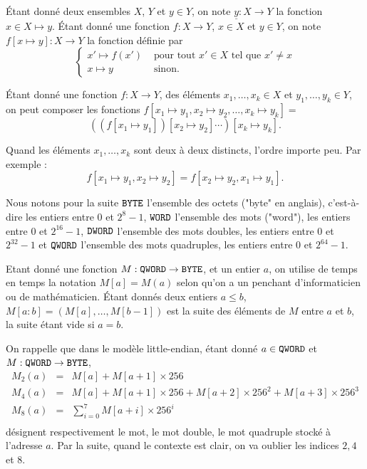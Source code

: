 \documentclass{book}
\newenvironment{formalisme}[1]{%
	\def\FrameCommand{\fboxrule=\FrameRule\fboxsep=\FrameSep \fcolorbox{red!10}{red!5}}%
	\MakeFramed {\advance\hsize-\width \FrameRestore}
	\noindent {\bf #1}\\
}%
{\endMakeFramed}
\newcommand{\BYTE}{{\tt BYTE}}
\newcommand{\WORD}{{\tt WORD}}
\newcommand{\DWORD}{{\tt DWORD}}
\newcommand{\QWORD}{{\tt QWORD}}
\begin{document}
\'Etant donné deux ensembles $X$, $Y$ et $y \in Y$, on note $\underline{y} : X \to Y$ la fonction $x \in X \mapsto y$. \'Etant donné une fonction $f : X \to Y$, $x \in X$ et $y \in Y$, on note $f[x \mapsto y] : X\to Y $ la fonction définie par
$$\left\{
\begin{array}{ll}
x' \mapsto f(x') & \text{ pour tout } x' \in X \text{ tel que }x' \neq x\\
x \mapsto y & \text{ sinon}.
\end{array}\right.$$

\'Etant donné une fonction $f : X \to Y$, des éléments $x_1, \ldots, x_k \in X$ et $y_1,\ldots, y_k \in Y$, 
on peut composer les fonctions $f[x_1 \mapsto y_1, x_2 \mapsto y_2, \ldots, x_k \mapsto y_k] = $
$$\left( (f[x_1 \mapsto y_1])[x_2 \mapsto y_2]\cdots\right)[x_k\mapsto y_k].$$ 

Quand les éléments $x_1, \ldots, x_k$ sont deux à deux distincts, l'ordre importe peu. Par exemple : 
$$f[x_1\mapsto y_1, x_2 \mapsto y_2] = f[x_2\mapsto y_2, x_1 \mapsto y_1].$$

Nous notons pour la suite $\BYTE$ l'ensemble des octets ("byte" en anglais), c'est-à-dire les entiers entre $0$ et $2^8 -1$, $\WORD$ l'ensemble des mots ("word"), les entiers entre $0$ et $2^{16} - 1$,  $\DWORD$ l'ensemble des mots doubles, les entiers entre $0$ et $2^{32} -1$ et  $\QWORD$ l'ensemble des mots quadruples, les entiers entre $0$ et $2^{64} - 1$.

Etant donné une fonction $M: \QWORD \to \BYTE$, et un entier $a$, on utilise de temps en temps la notation $M[a] = M(a)$ selon qu'on a un penchant d'informaticien ou de mathématicien. \'Etant donnés deux entiers $a \leq b$, $M[a:b] = (M[a], \ldots, M[b-1])$ est la suite des éléments de $M$ entre $a$ et $b$, la suite étant vide si $a=b$. 

On rappelle que dans le modèle little-endian, étant donné $a\in \QWORD$ et $M: \QWORD\to \BYTE$, $$\begin{array}{rcl}
M_2(a) &=& M[a] + M[a+1] \times 256\\
M_4(a) &=& M[a] + M[a+1]\times 256 + M[a+2]\times 256^{2} +M[a+3]\times 256^{3} \\
M_8(a) &=& \sum_{i = 0}^7 M[a+i] \times {256}^{i}\\
\end{array}$$
désignent respectivement le mot, le mot double, le mot quadruple stocké à l'adresse $a$. Par la suite, quand le contexte est clair, on va oublier les indices $2, 4$ et $8$. 
\end{document}
